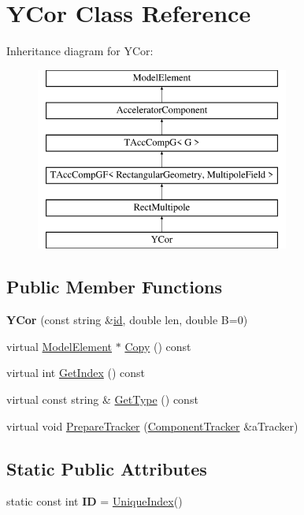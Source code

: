 \hypertarget{classYCor}{}\section{Y\+Cor Class Reference}
\label{classYCor}
Inheritance diagram for Y\+Cor\+:\begin{figure}[H]
\begin{center}
\leavevmode
\includegraphics[height=6.000000cm]{classYCor}
\end{center}
\end{figure}
\subsection*{Public Member Functions}
\begin{DoxyCompactItemize}
\item 
\mbox{\label{classYCor_a686eea6eb33d3449404a82fc740b362c}} 
{\bfseries Y\+Cor} (const string \&\hyperlink{classModelElement_aada171ead2085c75b592cf07d91bc5c2}{id}, double len, double B=0)
\item 
virtual \hyperlink{classModelElement}{Model\+Element} $\ast$ \hyperlink{classYCor_a3abe7858695c36ee89e50836d0a908b8}{Copy} () const
\item 
virtual int \hyperlink{classYCor_a7e13236734c9ea7f52ecc2ee27523c4f}{Get\+Index} () const
\item 
virtual const string \& \hyperlink{classYCor_afd6affaaca36f2c9a096eea1f6a1a767}{Get\+Type} () const
\item 
virtual void \hyperlink{classYCor_a6d5d11f3128222ae114d250a2f7d62bb}{Prepare\+Tracker} (\hyperlink{classComponentTracker}{Component\+Tracker} \&a\+Tracker)
\end{DoxyCompactItemize}
\subsection*{Static Public Attributes}
\begin{DoxyCompactItemize}
\item 
\mbox{\label{classYCor_a24b3a75498797da534869009bef11a4c}} 
static const int {\bfseries ID} = \hyperlink{classAcceleratorComponent_aa7ad4d39e1a488b705983842ed1ac784}{Unique\+Index}()
\end{DoxyCompactItemize}
